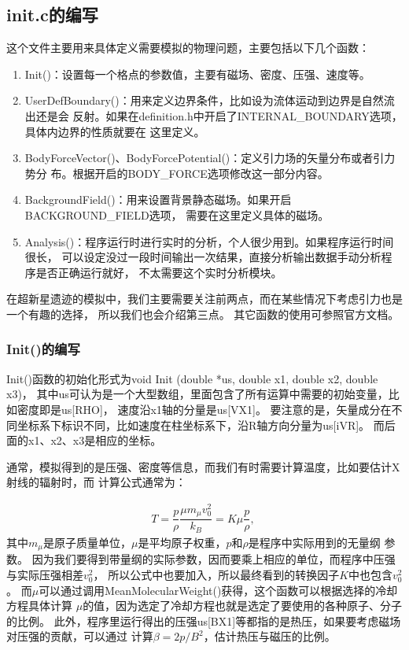 \subsection{init.c的编写}
这个文件主要用来具体定义需要模拟的物理问题，主要包括以下几个函数：

\begin{enumerate}

    \item Init()：设置每一个格点的参数值，主要有磁场、密度、压强、速度等。

    \item UserDefBoundary()：用来定义边界条件，比如设为流体运动到边界是自然流出还是会
    反射。如果在definition.h中开启了INTERNAL\_BOUNDARY选项，具体内边界的性质就要在
    这里定义。

    \item BodyForceVector()、BodyForcePotential()：定义引力场的矢量分布或者引力势分
    布。根据开启的BODY\_FORCE选项修改这一部分内容。

    \item BackgroundField()：用来设置背景静态磁场。如果开启BACKGROUND\_FIELD选项，
    需要在这里定义具体的磁场。

    \item Analysis()：程序运行时进行实时的分析，个人很少用到。如果程序运行时间很长，
    可以设定没过一段时间输出一次结果，直接分析输出数据手动分析程序是否正确运行就好，
    不太需要这个实时分析模块。

\end{enumerate}
在超新星遗迹的模拟中，我们主要需要关注前两点，而在某些情况下考虑引力也是一个有趣的选择，
所以我们也会介绍第三点。
其它函数的使用可参照官方文档。

\subsubsection{Init()的编写}
Init()函数的初始化形式为void Init (double *us, double x1, double x2, double x3)，
其中us可认为是一个大型数组，里面包含了所有运算中需要的初始变量，比如密度即是us[RHO]，
速度沿x1轴的分量是us[VX1]。
要注意的是，矢量成分在不同坐标系下标识不同，比如速度在柱坐标系下，沿R轴方向分量为us[iVR]。
而后面的x1、x2、x3是相应的坐标。

通常，模拟得到的是压强、密度等信息，而我们有时需要计算温度，比如要估计X射线的辐射时，而
计算公式通常为：

\begin{equation}
  \begin{aligned}
    T = \dfrac{p}{\rho}\dfrac{\mu m_{\mu}v_0^2}{k_B}=K\mu\dfrac{p}{\rho} ,   \
  \end{aligned}
\end{equation}
其中$m_{\mu}$是原子质量单位，$\mu$是平均原子权重，$p$和$\rho$是程序中实际用到的无量纲
参数。
因为我们要得到带量纲的实际参数，因而要乘上相应的单位，而程序中压强与实际压强相差$v_0^2$，
所以公式中也要加入，所以最终看到的转换因子$K$中也包含$v_0^2$。
而$\mu$可以通过调用MeanMolecularWeight()获得，这个函数可以根据选择的冷却方程具体计算
$\mu$的值，因为选定了冷却方程也就是选定了要使用的各种原子、分子的比例。
此外，程序里运行得出的压强us[BX1]等都指的是热压，如果要考虑磁场对压强的贡献，可以通过
计算$\beta=2p/B^2$，估计热压与磁压的比例。

